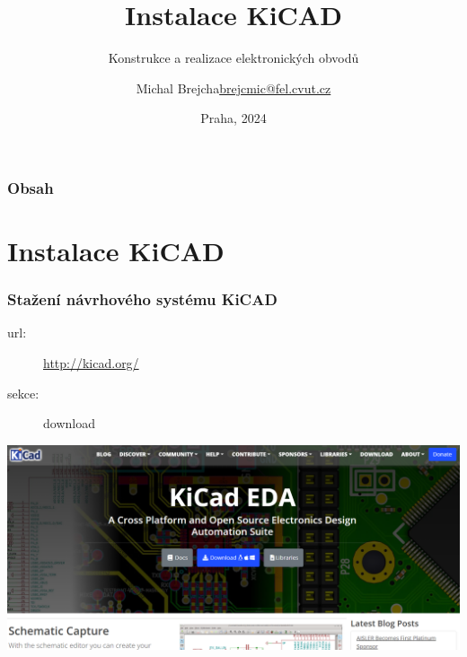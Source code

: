 \documentclass{beamer}
\title[Instalace KiCAD]{Instalace KiCAD}
\subtitle[KEO] {Konstrukce a realizace elektronických obvodů}
\author[Brejcha]{\texorpdfstring{Michal Brejcha\newline\url{brejcmic@fel.cvut.cz}}{Michal Brejcha}}
\institute[ČVUT]{ČVUT v Praze, FEL}
\date[Praha, 2024]{Praha, 2024}
\begin{document}
\frame{\titlepage}

\begin{frame}
\frametitle{Obsah} 
\tableofcontents
\end{frame}


\section{\texorpdfstring{Instalace KiCAD}{Instalace Kicad}}
	\begin{frame}
    \frametitle{Stažení návrhového systému KiCAD}
		
		\begin{description}
			\item[url:] \url{http://kicad.org/}
			\item[sekce:] download
		\end{description}
		
		\begin{center}
			\includegraphics[scale=0.3]{obr/kicad_url.png}
		\end{center}
	\end{frame}
\end{document}
